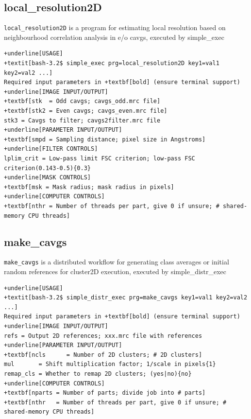 \documentclass[a4paper,11pt]{article}
\newcommand{\prgname}[1]{\textcolor{NavyBlue}{\texttt{#1}}}
\begin{document}
\subsection{local\_resolution2D}
\label{local_resolution2D}
\prgname{local\_resolution2D} is a program for estimating local resolution based on neighbourhood correlation analysis in e/o cavgs, executed by simple\_exec
\begin{Verbatim}[commandchars=+\[\],fontsize=\small,breaklines=true]
+underline[USAGE]
+textit[bash-3.2$ simple_exec prg=local_resolution2D key1=val1 key2=val2 ...]
Required input parameters in +textbf[bold] (ensure terminal support)
+underline[IMAGE INPUT/OUTPUT]
+textbf[stk  = Odd cavgs; cavgs_odd.mrc file]
+textbf[stk2 = Even cavgs; cavgs_even.mrc file]
stk3 = Cavgs to filter; cavgs2filter.mrc file
+underline[PARAMETER INPUT/OUTPUT]
+textbf[smpd = Sampling distance; pixel size in Angstroms]
+underline[FILTER CONTROLS]
lplim_crit = Low-pass limit FSC criterion; low-pass FSC criterion(0.143-0.5){0.3}
+underline[MASK CONTROLS]
+textbf[msk = Mask radius; mask radius in pixels]
+underline[COMPUTER CONTROLS]
+textbf[nthr = Number of threads per part, give 0 if unsure; # shared-memory CPU threads]
\end{Verbatim}

\subsection{make\_cavgs}
\label{make_cavgs}
\prgname{make\_cavgs} is a distributed workflow for generating class averages or initial random references for cluster2D execution, executed by simple\_distr\_exec
\begin{Verbatim}[commandchars=+\[\],fontsize=\small,breaklines=true]
+underline[USAGE]
+textit[bash-3.2$ simple_distr_exec prg=make_cavgs key1=val1 key2=val2 ...]
Required input parameters in +textbf[bold] (ensure terminal support)
+underline[IMAGE INPUT/OUTPUT]
refs = Output 2D references; xxx.mrc file with references
+underline[PARAMETER INPUT/OUTPUT]
+textbf[ncls      = Number of 2D clusters; # 2D clusters]
mul       = Shift multiplication factor; 1/scale in pixels{1}
remap_cls = Whether to remap 2D clusters; (yes|no){no}
+underline[COMPUTER CONTROLS]
+textbf[nparts = Number of parts; divide job into # parts]
+textbf[nthr   = Number of threads per part, give 0 if unsure; # shared-memory CPU threads]
\end{Verbatim}
\end{document}
